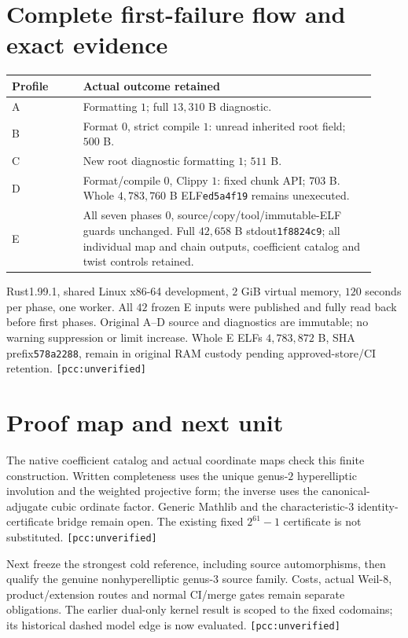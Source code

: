 \documentclass[10pt,a4paper]{article}
\newcommand{\uv}{\texttt{[pcc:unverified]}}
\begin{document}
\section{Complete first-failure flow and exact evidence}
\begin{center}\begin{tabular}{@{}L{0.18\linewidth}L{0.74\linewidth}@{}}
\toprule
Profile & Actual outcome retained\\\midrule
A & Formatting $1$; full $13{,}310$ B diagnostic.\\
B & Format $0$, strict compile $1$: unread inherited root field; $500$ B.\\
C & New root diagnostic formatting $1$; $511$ B.\\
D & Format/compile $0$, Clippy $1$: fixed chunk API; $703$ B.
Whole $4{,}783{,}760$ B ELF\texttt{ed5a4f19} remains unexecuted.\\
E & All seven phases $0$, source/copy/tool/immutable-ELF guards unchanged.
Full $42{,}658$ B stdout\texttt{1f8824c9}; all individual map and chain
outputs, coefficient catalog and twist controls retained.\\
\bottomrule\end{tabular}\end{center}

Rust1.99.1, shared Linux x86-64 development, $2$ GiB virtual memory,
$120$ seconds per phase, one worker. All $42$ frozen E inputs were
published and fully read back before first phases. Original A--D source
and diagnostics are immutable; no warning suppression or limit increase.
Whole E ELFs $4{,}783{,}872$ B, SHA prefix\texttt{578a2288}, remain
in original RAM custody pending approved-store/CI retention. \uv

\section{Proof map and next unit}
The native coefficient catalog and actual coordinate maps check this
finite construction. Written completeness uses the unique genus-$2$
hyperelliptic involution and the weighted projective form; the inverse
uses the canonical-adjugate cubic ordinate factor. Generic Mathlib and
the characteristic-$3$ identity-certificate bridge remain open.
The existing fixed $2^{61}-1$ certificate is not substituted. \uv

Next freeze the strongest cold reference, including source automorphisms,
then qualify the genuine nonhyperelliptic genus-$3$ source family. Costs,
actual Weil-$8$, product/extension routes and normal CI/merge gates remain
separate obligations. The earlier dual-only kernel result is scoped to
the fixed codomains; its historical dashed model edge is now evaluated. \uv
\end{document}
